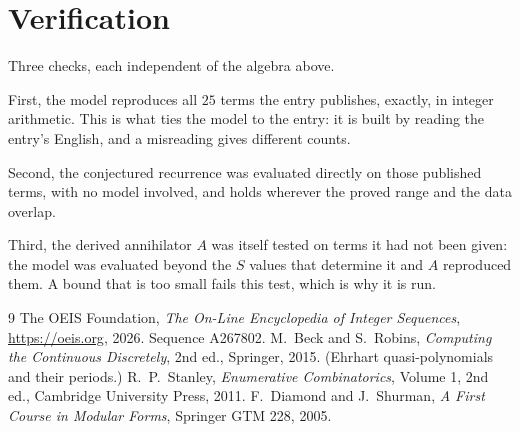 \documentclass[11pt,a4paper]{article}
\theoremstyle{plain}
\theoremstyle{definition}
\begin{document}
\section{Verification}

Three checks, each independent of the algebra above.

First, the model reproduces all $25$ terms the entry publishes, exactly, in integer
arithmetic. This is what ties the model to the entry: it is built by reading the entry's
English, and a misreading gives different counts.

Second, the conjectured recurrence was evaluated directly on those published terms, with no
model involved, and holds wherever the proved range and the data overlap.

Third, the derived annihilator $A$ was itself tested on terms it had not been given: the model
was evaluated beyond the $S$ values that determine it and $A$ reproduced them. A bound that is
too small fails this test, which is why it is run.

\begin{thebibliography}{9}
 The OEIS Foundation, \emph{The On-Line Encyclopedia of Integer
Sequences}, \url{https://oeis.org}, 2026. Sequence A267802.
 M.~Beck and S.~Robins, \emph{Computing the Continuous Discretely},
2nd ed., Springer, 2015. (Ehrhart quasi-polynomials and their periods.)
 R.~P.~Stanley, \emph{Enumerative Combinatorics}, Volume 1, 2nd ed.,
Cambridge University Press, 2011.
 F.~Diamond and J.~Shurman, \emph{A First Course in Modular Forms},
Springer GTM 228, 2005.
\end{thebibliography}
\end{document}
